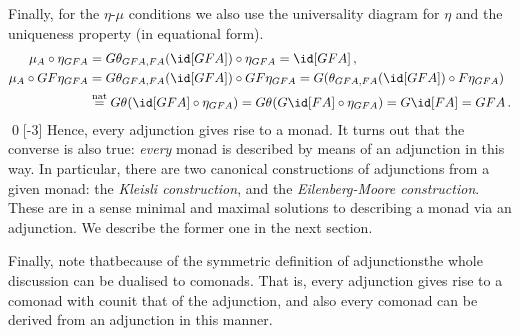 \documentclass{svmult}
\begin{document}
Finally, for the $\eta$-$\mu$ conditions we also use the universality diagram for $\eta$ and the uniqueness property (in equational form).
\begin{align*}
\mu_A\circ\eta_{GFA} &= G\theta_{GFA,FA}(\id[GFA])\circ\eta_{GFA} = \id[GFA]\,, \\
\mu_A\circ GF\eta_{GFA} &= G\theta_{GFA,FA}(\id[GFA])\circ GF\eta_{GFA} = G(\theta_{GFA,FA}(\id[GFA])\circ F\eta_{GFA}) \\
    &\overset{\text{nat}}{=} G\theta_{}(\id[GFA]\circ\eta_{GFA}) = G\theta_{}(G\id[FA]\circ\eta_{GFA}) = G\id[FA]  = GFA\,.
\end{align*}
\qed[-3]
%
Hence, every adjunction gives rise to a monad. It turns out that the converse is also true: \emph{every} monad is described by means of an adjunction
in this way. In particular, there are two canonical constructions of adjunctions from a given monad: the \emph{Kleisli construction}, and the
\emph{Eilenberg-Moore construction}. These are in a sense minimal and maximal solutions to describing a monad via an adjunction. We describe the former
one in the next section. %

Finally, note that\HY because of the symmetric definition of adjunctions\HY the whole discussion can be dualised to comonads. That is, every adjunction
gives rise to a comonad with counit that of the adjunction, and also every comonad can be derived from an adjunction in this manner.
\end{document}
